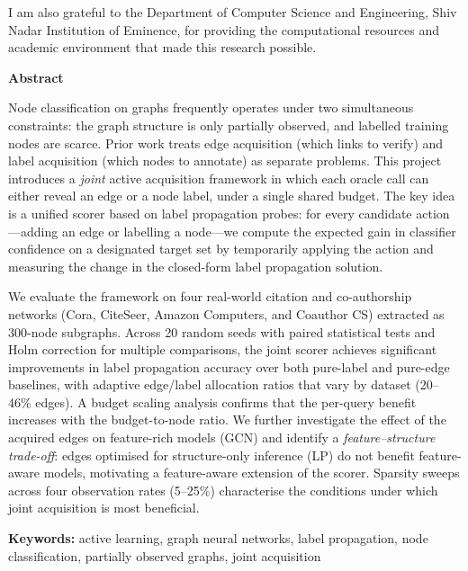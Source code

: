 \documentclass[12pt,a4paper,oneside]{report}
\newcommand{\university}{Shiv Nadar Institution of Eminence}
\begin{document}
I am also grateful to the Department of Computer Science and Engineering, \university, for providing the computational resources and academic environment that made this research possible.

\newpage
\begin{center}
{\Large\bfseries Abstract}
\end{center}
\vspace{0.5cm}

Node classification on graphs frequently operates under two simultaneous constraints: the graph structure is only partially observed, and labelled training nodes are scarce. Prior work treats edge acquisition (which links to verify) and label acquisition (which nodes to annotate) as separate problems. This project introduces a \emph{joint} active acquisition framework in which each oracle call can either reveal an edge or a node label, under a single shared budget. The key idea is a unified scorer based on label propagation probes: for every candidate action---adding an edge or labelling a node---we compute the expected gain in classifier confidence on a designated target set by temporarily applying the action and measuring the change in the closed-form label propagation solution.

We evaluate the framework on four real-world citation and co-authorship networks (Cora, CiteSeer, Amazon Computers, and Coauthor CS) extracted as 300-node subgraphs. Across 20 random seeds with paired statistical tests and Holm correction for multiple comparisons, the joint scorer achieves significant improvements in label propagation accuracy over both pure-label and pure-edge baselines, with adaptive edge/label allocation ratios that vary by dataset (20--46\% edges). A budget scaling analysis confirms that the per-query benefit increases with the budget-to-node ratio. We further investigate the effect of the acquired edges on feature-rich models (GCN) and identify a \emph{feature--structure trade-off}: edges optimised for structure-only inference (LP) do not benefit feature-aware models, motivating a feature-aware extension of the scorer. Sparsity sweeps across four observation rates (5--25\%) characterise the conditions under which joint acquisition is most beneficial.

\vspace{0.5cm}
\noindent\textbf{Keywords:} active learning, graph neural networks, label propagation, node classification, partially observed graphs, joint acquisition
\end{document}
